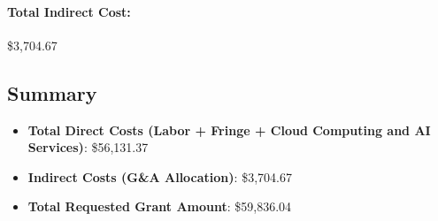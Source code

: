 \paragraph{Total Indirect Cost:} \$3,704.67

\subsection*{Summary}
\begin{itemize}
    \item \textbf{Total Direct Costs (Labor + Fringe + Cloud Computing and AI Services)}: \$56,131.37
    \item \textbf{Indirect Costs (G\&A Allocation)}: \$3,704.67
    \item \textbf{Total Requested Grant Amount}: \$59,836.04
\end{itemize}
